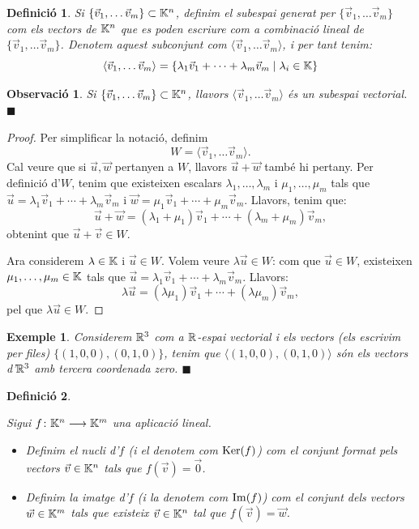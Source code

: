 \documentclass[
  11pt,
]{book}
\numberwithin{dummy}{section}
\theoremstyle{maincolornumbox}
\newtheorem{remarkT}{Observació}[chapter]
\theoremstyle{blacknumex}
\newtheorem{exampleT}{Exemple}[chapter]
\theoremstyle{blacknumbox}
\newtheorem{definitionT}{Definició}[chapter]
\theoremstyle{maincolornum}
\newenvironment{definition}{\begin{dBox}\begin{definitionT}}{\end{definitionT}\end{dBox}}
\newenvironment{example}{\begin{exampleT}}{\hfill{\tiny\ensuremath{\blacksquare}}\end{exampleT}}
\newenvironment{remark}{\begin{remarkT}}{\hfill{\tiny\ensuremath{\blacksquare}}\end{remarkT}}
\newlength\esp
\begin{document}
\begin{definition}
\protect\hypertarget{def:subespaigenerat}{}\label{def:subespaigenerat}Si
\(\{\vec v_1, \dots \vec v_m\}\subset \mathbb{K}^n\), definim el \emph{subespai generat
per \(\{\vec v_1, \dots \vec v_m\}\)} com els vectors de \(\mathbb{K}^n\) que es
poden escriure com a combinació lineal de
\(\{\vec v_1, \dots \vec v_m\}\). Denotem aquest subconjunt com
\(\langle \vec v_1, \dots \vec v_m \rangle\), i per tant tenim:
\[\langle \vec v_1, \dots \vec v_m \rangle = \{\lambda_1 \vec v_1 + \cdots + \lambda_m\vec v_m \mid \lambda_i\in\mathbb{K} \}\]
\end{definition}

\begin{remark}
Si \(\{\vec v_1, \dots \vec v_m\}\subset \mathbb{K}^n\), llavors
\(\langle \vec v_1, \dots \vec v_m \rangle\) és un subespai vectorial.
\end{remark}

\begin{proof}
Per simplificar la notació, definim
\[W=\langle \vec v_1, \dots \vec v_m \rangle .\] Cal veure que si
\(\vec u, \vec w\) pertanyen a \(W\), llavors \(\vec u+\vec w\) també hi
pertany. Per definició d'\(W\), tenim que existeixen escalars
\(\lambda_1, \dots ,\lambda_m\) i \(\mu_1,\dots,\mu_m\) tals que
\(\vec u= \lambda_1 \vec v_1+\cdots +\lambda_m\vec v_m\) i
\(\vec w=\mu_1\vec v_1+\cdots +\mu_m\vec v_m\). Llavors, tenim que:
\[\vec u+\vec w = (\lambda_1+\mu_1)\vec v_1 + \cdots + (\lambda_m+\mu_m)\vec v_m ,\]
obtenint que \(\vec u+\vec v \in W\).

Ara considerem \(\lambda \in \mathbb{K}\) i \(\vec u\in W\). Volem veure
\(\lambda \vec u \in W\): com que \(\vec u\in W\), existeixen
\(\mu_1, \dots , \mu_m\in\mathbb{K}\) tals que
\(\vec u=\lambda_1\vec v_1 + \cdots + \lambda_m\vec v_m\). Llavors:
\[\lambda \vec u = (\lambda \mu_1)\vec v_1 + \cdots + (\lambda \mu_m)\vec v_m ,\]
pel que \(\lambda \vec u \in W\).
\end{proof}

\begin{example}
Considerem \(\mathbb{R}^3\) com a \(\mathbb{R}\)-espai vectorial i els vectors (els escrivim
per files) \(\{(1,0,0),(0,1,0)\}\), tenim que
\(\langle (1,0,0),(0,1,0)\rangle\) són els vectors d'\(\mathbb{R}^3\) amb tercera
coordenada zero.
\end{example}

\begin{definition}
\protect\hypertarget{def:nucliimatge}{}\label{def:nucliimatge}

Sigui
\(f\colon \mathbb{K}^n \longrightarrow \mathbb{K}^m\) una aplicació lineal.

\begin{itemize}
\item
  Definim el \emph{nucli d'\(f\)} (i el denotem com \(\operatorname{Ker}(f)\)) com el conjunt
  format pels vectors \(\vec v\in \mathbb{K}^n\) tals que \(f(\vec v)=\vec 0\).
\item
  Definim la \emph{imatge d'\(f\)} (i la denotem com \(\operatorname{Im}(f)\)) com el
  conjunt dels vectors \(\vec w\in\mathbb{K}^m\) tals que existeix
  \(\vec v\in \mathbb{K}^n\) tal que \(f(\vec v)=\vec w\).
\end{itemize}

\end{definition}
\end{document}
